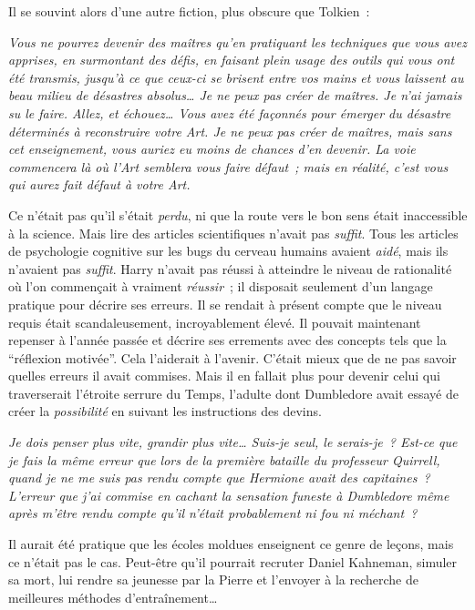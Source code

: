 Il se souvint alors d'une autre fiction, plus obscure que Tolkien~:

\emph{Vous ne pourrez devenir des maîtres qu'en pratiquant les techniques que vous avez apprises, en surmontant des défis, en faisant plein usage des outils qui vous ont été transmis, jusqu'à ce que ceux-ci se brisent entre vos mains et vous laissent au beau milieu de désastres absolus… Je ne peux pas créer de maîtres. Je n'ai jamais su le faire. Allez, et échouez… Vous avez été façonnés pour émerger du désastre déterminés à reconstruire votre Art. Je ne peux pas créer de maîtres, mais sans cet enseignement, vous auriez eu moins de chances d'en devenir. La voie commencera là où l'Art semblera vous faire défaut~; mais en réalité, c'est vous qui aurez fait défaut à votre Art.}

Ce n'était pas qu'il s'était \emph{perdu}, ni que la route vers le bon sens était inaccessible à la science. Mais lire des articles scientifiques n'avait pas \emph{suffit}. Tous les articles de psychologie cognitive sur les bugs du cerveau humains avaient \emph{aidé}, mais ils n'avaient pas \emph{suffit}. Harry n'avait pas réussi à atteindre le niveau de rationalité où l'on commençait à vraiment \emph{réussir}~; il disposait seulement d'un langage pratique pour décrire ses erreurs. Il se rendait à présent compte que le niveau requis était scandaleusement, incroyablement élevé. Il pouvait maintenant repenser à l'année passée et décrire ses errements avec des concepts tels que la “réflexion motivée”. Cela l'aiderait à l'avenir. C'était mieux que de ne pas savoir quelles erreurs il avait commises. Mais il en fallait plus pour devenir celui qui traverserait l'étroite serrure du Temps, l'adulte dont Dumbledore avait essayé de créer la \emph{possibilité} en suivant les instructions des devins.

\emph{Je dois penser plus vite, grandir plus vite… Suis-je seul, le serais-je~? Est-ce que je fais la même erreur que lors de la première bataille du professeur Quirrell, quand je ne me suis pas rendu compte que Hermione avait des capitaines~? L'erreur que j'ai commise en cachant la sensation funeste à Dumbledore même après m'être rendu compte qu'il n'était probablement ni fou ni méchant~?}

Il aurait été pratique que les écoles moldues enseignent ce genre de leçons, mais ce n'était pas le cas. Peut-être qu'il pourrait recruter Daniel Kahneman, simuler sa mort, lui rendre sa jeunesse par la Pierre et l'envoyer à la recherche de meilleures méthodes d'entraînement…

